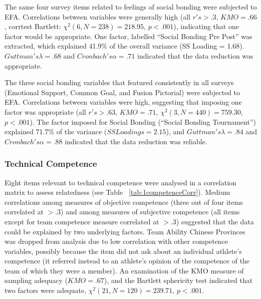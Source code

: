 \begin{CJK}{UTF8}{gbsn}
The same four survey items related to feelings of social bonding were subjected to EFA.  Correlations between variables were generally high (all $r's > .3$, $KMO = .66$, corrtest Bartlett: $\chi^2(6, N = 238) = 218.95$, $p < .001$), indicating that one factor would be appropriate.  One factor, labelled ``Social Bonding Pre Post'' was extracted, which explained 41.9\% of the overall variance (SS Loading = 1.68).  $Guttman's \lambda =.68$ and $Cronbach's \alpha = .71$ indicated that the data reduction was appropriate.

The three social bonding variables that featured consistently in all surveys (Emotional Support, Common Goal, and Fusion Pictorial) were subjected to EFA.  Correlations between variables were high, suggesting that imposing one factor was appropriate (all $r's > .63$, $KMO = .71$, $\chi^2(3, N = 440) =  759.30$, $p < .001$).  The factor imposed for Social Bonding (``Social Bonding Tournament'') explained 71.7\% of the variance ($SS Loadings =  2.15$), and $Guttman's \lambda =.84$ and $Cronbach's \alpha= .88$ indicated that the data reduction was reliable.


\subsubsection{Technical Competence}
Eight items relevant to technical competence were analysed in a correlation matrix to assess relatedness (see Table ~\ref{tab:1competenceCorr}). Medium correlations among measures of objective competence (three out of four items correlated at $> .3$) and among measures of subjective competence (all items except for team competence measure correlated at $> .3$) suggested that the data could be explained by two underlying factors. Team Ability Chinese Provinces was dropped from analysis due to low correlation with other competence variables, possibly because the item did not ask about an individual athlete’s competence (it referred instead to an athlete’s opinion of the competence of the team of which they were a member). An examination of the KMO measure of sampling adequacy ($KMO = .67$), and the Bartlett sphericity test indicated that two factors were adequate, $\chi^2(21, N = 120) = 239.71$, $p < .001$. \\


\end{CJK}
